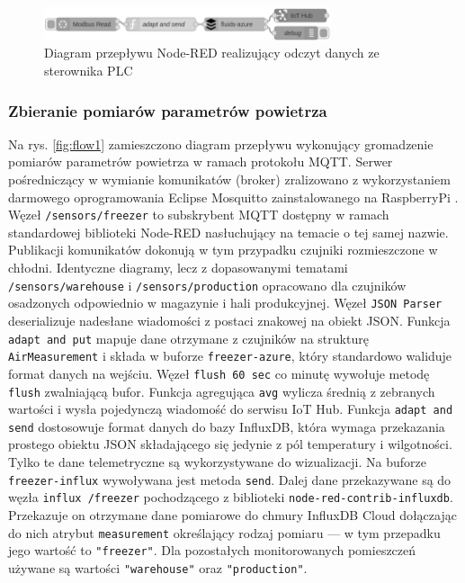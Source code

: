 \documentclass[a4paper, 12pt, twoside]{article}
\begin{document}
\begin{figure}[h]
      \centering
      \includegraphics[width=0.75\textwidth]{flow3.png}
      \caption{Diagram przepływu Node-RED realizujący odczyt danych ze sterownika PLC}
      \label{fig:flow3}
\end{figure}

\subsubsection{Zbieranie pomiarów parametrów powietrza }

Na rys. \ref{fig:flow1} zamieszczono diagram przepływu wykonujący gromadzenie pomiarów parametrów
powietrza w ramach protokołu MQTT. Serwer pośredniczący w wymianie komunikatów
(broker) zralizowano z wykorzystaniem darmowego oprogramowania
Eclipse Mosquitto zainstalowanego na RaspberryPi \cite{mosquitto}. Węzeł
\texttt{/sensors/freezer} to subskrybent MQTT dostępny w ramach standardowej
biblioteki Node-RED nasłuchujący na temacie o tej samej nazwie. Publikacji
komunikatów  dokonują w tym przypadku czujniki rozmieszczone w
chłodni. Identyczne diagramy, lecz z dopasowanymi tematami \texttt{/sensors/warehouse} i
\texttt{/sensors/production} opracowano dla czujników osadzonych odpowiednio
w magazynie i hali produkcyjnej. Węzeł \texttt{JSON Parser} deserializuje
nadesłane wiadomości z postaci znakowej na obiekt JSON. Funkcja \texttt{adapt and put}
mapuje dane otrzymane z czujników na strukturę \texttt{AirMeasurement}
i składa w buforze \texttt{freezer-azure}, który standardowo waliduje format
danych na wejściu. Węzeł \texttt{flush 60 sec} co minutę wywołuje metodę \texttt{flush}
zwalniającą bufor. Funkcja agregująca \texttt{avg} wylicza średnią z zebranych
wartości i wysła pojedynczą wiadomość do serwisu IoT Hub. Funkcja \texttt{adapt and send}
dostosowuje format danych do bazy InfluxDB, która wymaga przekazania
prostego obiektu JSON składającego się jedynie z pól temperatury i wilgotności.
Tylko te dane telemetryczne są wykorzystywane do wizualizacji. Na buforze
\texttt{freezer-influx} wywoływana jest metoda \texttt{send}. Dalej dane
przekazywane są do węzła \texttt{influx /freezer} pochodzącego z biblioteki
\texttt{node-red-contrib-influxdb}. Przekazuje on otrzymane dane pomiarowe
do chmury InfluxDB Cloud dołączając do nich atrybut \texttt{measurement}
określający rodzaj pomiaru --- w tym przepadku jego wartość to \texttt{"freezer"}.
Dla pozostałych monitorowanych pomieszczeń używane są wartości \texttt{"warehouse"}
oraz \texttt{"production"}.
\end{document}
